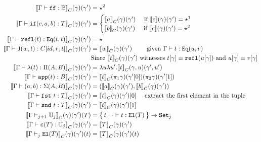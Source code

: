 \begin{align*}
  \denotesC{\goodTerm{\Gm}{\false}{\cB}}(\gm)(\gm') &= \star^2 \\
  \denotesC{\goodTerm{\Gm}{\ifb{c}{a}{b}}{T}}(\gm)(\gm') &= 
  \begin{cases}
    \denotesC{a}(\gm)(\gm') \quad \text{ if } \denotes{c}(\gm)(\gm') = \star^1 \\
    \denotesC{b}(\gm)(\gm') \quad \text{ if } \denotes{c}(\gm)(\gm') = \star^2
  \end{cases}\\
  \denotesC{\goodTerm{\Gm}{\eqrefl{t}}{\TyId{t}{t}}}(\gm)(\gm') &= \star\\
  \denotesC{\goodTerm{\Gm}{\Jeq{w}{t}}{\sub{C}{\SubstExt{\SubstExt{id}{v}}{t} }}}(\gm)(\gm') &= \denotesC{w}(\gm)(\gm') \quad \quad \text{ given } \goodTerm{\Gm}{t}{\TyId{u}{v}} \\ 
  & \text{Since $\denotesC{t}(\gm)(\gm')$ witnesses } \sub{t}{\gm} \equiv \eqrefl{\sub{u}{\gm}} \text{ and } \sub{u}{\gm} \equiv \sub{v}{\gm} \\
  \denotesC{\goodTerm{\Gm}{\lam{t}}{\TyPi{A}{B}}}(\gm)(\gm') &= \lambda u \lambda u' . \denotesC{t}(\SubstExt{\gm}{u}) (\gm' , u') \\
  \denotesC{\goodTerm{\Gm}{\app{t}}{B}}(\gm)(\gm') &= \denotesC{t}(\pi_1 \gm)(\gm'[0])(\pi_2 \gm)(\gm'[1]) \\
  \denotesC{\goodTerm{\Gm}{\pair{a}{b}}{\TySigma{A}{B}}}(\gm)(\gm') &= (\denotesC{a}(\gm)(\gm') , \denotesC{b}(\gm)(\gm') )\\
  \denotesC{\goodTerm{\Gm}{\fst{t}}{T}}(\gm)(\gm') &= \denotesC{t}(\gm)(\gm')[0]  \quad \text{ extract the first element in the tuple }\\
  \denotesC{\goodTerm{\Gm}{\snd{t}}{T}}(\gm)(\gm') &= \denotesC{t}(\gm)(\gm')[1]\\
  \denotesC{\goodType{\Gm}{\cU_j}{j+1}}(\gm)(\gm')(T) &= \setc{t} { \goodTerm{\cdot}{t}{\El{T}} }  \to \Set{j} \\
  \denotesC{\goodTerm{\Gm}{\codety{T}}{\cU_j}}(\gm)(\gm') &= \denotesC{T}(\gm)(\gm') \\ 
  \denotesC{\goodType{\Gm}{\El{T}}{j}}(\gm)(\gm')(t) &= \denotesC{T}(\gm)(\gm')(t) \\
\end{align*}

